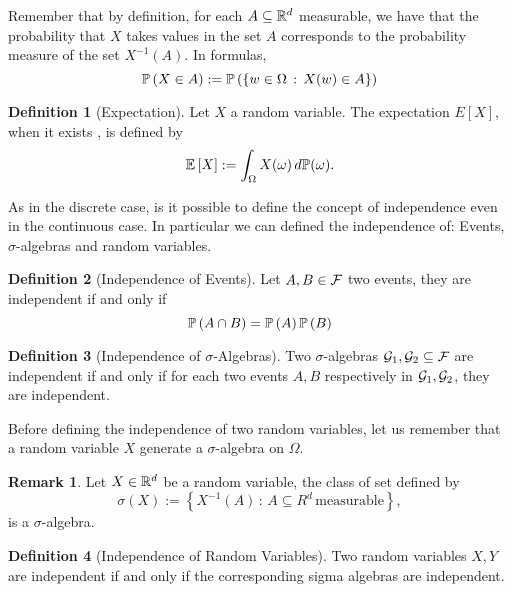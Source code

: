 \documentclass{report}
\theoremstyle{definition}
\newtheorem{defn}{Definition}
\newtheorem{oss}{Remark}
\begin{document}
Remember that by definition, for each $A\subseteq \mathbb{R}^d$ measurable, we have
that the probability that $X$ takes values in the set $A$ corresponds to the
probability measure of the set $X^{-1}(A)$. In formulas, 
\begin{equation}
  \mathbb{P}\left(X\in A\right):=\mathbb{P}\left( \left\{ w\in\Omega\,:\,X(w)\in A \right\}
  \right)
  \label{eq:prob}
\end{equation}


\begin{defn}[Expectation]
  Let $X$ a random variable. The expectation $E[X]$, when it exists , is
  defined by
  \begin{equation}
    \mathbb{E}\left[ X \right]:=\int_\Omega X(\omega)\, d\mathbb{P}(\omega).
    \label{eq:expectation}
  \end{equation}
\end{defn}

As in the discrete case, is it possible to define the concept of independence
even in the continuous case. In particular we can defined the independence of:
Events, $\sigma$-algebras and random variables.

\begin{defn}[Independence of Events]
  Let $A,B\in\mathcal{F}$ two events, they are independent if and only if
  \begin{equation}
    \mathbb{P}\left( A\cap B \right)=\mathbb{P}\left( A \right) \mathbb{P}\left(B \right)
  \end{equation}
\end{defn}

\begin{defn}[Independence of $\sigma$-Algebras]
  Two $\sigma$-algebras $\mathcal{G}_1, \mathcal{G}_2 \subseteq \mathcal{F}$ are independent if and
  only if for each two events $A,B$ respectively in $\mathcal{G}_1, \mathcal{G}_2$, they are
  independent.
\end{defn}

Before defining the independence of two random variables, let us remember
that a random variable $X$ generate a $\sigma$-algebra on $\Omega$.
\begin{oss}
  Let $X\in\mathbb{R}^d$ be a random variable, the class of set defined by
  \[
    \sigma(X):=\left\{ X^{-1}(A)\,:\, A\subseteq R^d\,\mbox{measurable}
    \right\},
  \]
  is a $\sigma$-algebra.
\end{oss}
\begin{defn}[Independence of Random Variables]
  Two random variables $X,Y$ are independent if and only if the corresponding
  sigma algebras are independent.
\end{defn}
\end{document}
